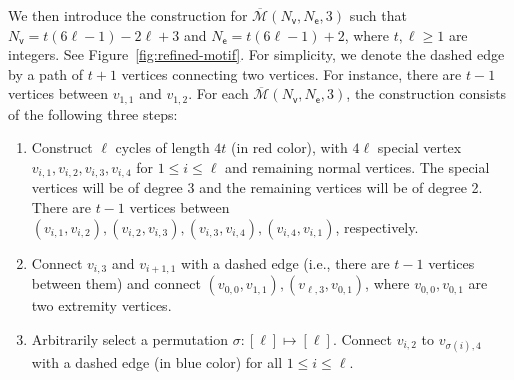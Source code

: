 \documentclass[letterpaper,11pt]{article}
\theoremstyle{definition}
\newcommand{\maM}{\mathcal{M}}
\newcommand{\sfe}{{\mathsf{e}}}
\newcommand{\sfv}{{\mathsf{v}}}
\begin{document}
We then introduce the construction for $\overline{\maM}(N_\sfv,N_\sfe,3)$ such that $N_\sfv = t(6\ell -1)-2\ell+3$ and $N_\sfe= t(6\ell-1)+2$, where $t,\ell\ge 1$ are integers.
See Figure~\ref{fig:refined-motif}.
For simplicity, we denote the dashed edge by a path of $t+1$ vertices connecting two vertices. For instance, there are $t-1$ vertices between $v_{1,1}$ and $v_{1,2}$. For each $\overline{\maM}(N_\sfv,N_\sfe,3)$, the construction consists of the following three steps:\begin{enumerate}
    \item Construct $\ell$ cycles of length $4t$ (in red color), with $4\ell$ special vertex $v_{i,1},v_{i,2},v_{i,3},v_{i,4}$ for $1\le i\le \ell$ and remaining normal vertices. The special vertices will be of degree 3 and the remaining vertices will be of degree 2. There are $t-1$ vertices between $(v_{i,1},v_{i,2}),(v_{i,2},v_{i,3}),(v_{i,3},v_{i,4}),(v_{i,4},v_{i,1})$, respectively. 
    \item Connect $v_{i,3}$ and $v_{i+1,1}$ with a dashed edge (i.e., there are $t-1$ vertices between them) and connect $(v_{0,0},v_{1,1}),(v_{\ell,3},v_{0,1})$, where $v_{0,0},v_{0,1}$ are two extremity vertices.
    \item\label{item:refined-step3} Arbitrarily select a permutation $\sigma:[\ell]\mapsto [\ell]$. Connect $v_{i,2}$ to $v_{\sigma(i),4}$ with a dashed edge (in blue color) for all $1\le i\le \ell$.
\end{enumerate}
\end{document}
